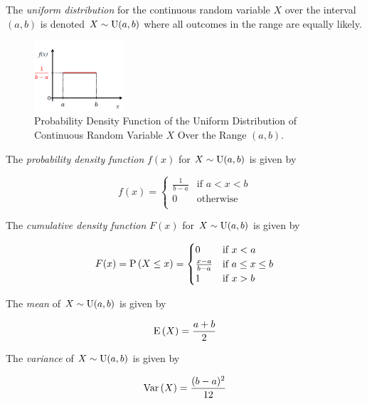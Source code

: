 \begin{definition}
    The \textit{uniform distribution} for the continuous random variable $X$ over the interval $(a, b)$ is denoted $X \sim \mathrm{U}(a, b)$ where all outcomes in the range are equally likely.

    \begin{figure}[H]
        \centering
        \includegraphics[width=0.3\textwidth]{content/img/4-uniform-pdf.png}
        \caption{Probability Density Function of the Uniform Distribution of Continuous Random Variable $X$ Over the Range $(a, b)$.}
        \label{fig:uniform_pdf}
    \end{figure}
    
    The \textit{probability density function} $f(x)$ for $X \sim \mathrm{U}(a, b)$ is given by

    \begin{equation}
        f(x) = \begin{cases}
            \frac{1}{b - a} & \text{if $a < x < b$} \\
            0 & \text{otherwise} \\
        \end{cases}
    \end{equation}
    
    The \textit{cumulative density function} $F(x)$ for $X \sim \mathrm{U}(a, b)$ is given by
    
    \begin{equation}
        F(x) = \mathrm{P} \left( X \le x \right) = \begin{cases}
            0 & \text{if $x < a$} \\
            \frac{x - a}{b - a} & \text{if $a \le x \le b$} \\
            1 & \text{if $x > b$} \\
        \end{cases}
    \end{equation}
    
    The \textit{mean} of $X \sim \mathrm{U}(a, b)$ is given by
    
    \begin{equation}
        \mathrm{E} \left( X \right) = \frac{a + b}{2}
    \end{equation}
    
    The \textit{variance} of $X \sim \mathrm{U}(a, b)$ is given by
    
    \begin{equation}
        \mathrm{Var} \left( X \right) = \frac{(b - a)^2}{12}
    \end{equation}
\end{definition}
